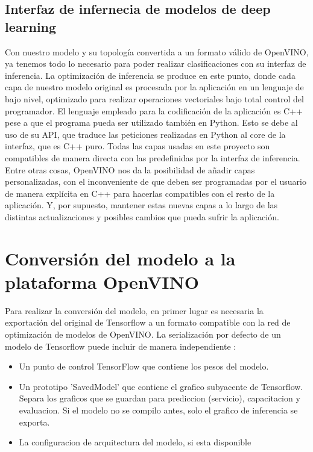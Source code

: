 \subsection{Interfaz de infernecia de modelos de deep learning}\label{subsec:interfaz-de-infernecia-de-modelos-de-deep-learning}
Con nuestro modelo y su topología convertida a un formato válido de OpenVINO, ya tenemos todo lo necesario para poder realizar clasificaciones con su interfaz de inferencia\@.
La optimización de inferencia se produce en este punto, donde cada capa de nuestro modelo original es procesada por la aplicación en un lenguaje de bajo nivel, optimizado para realizar operaciones vectoriales bajo total control del programador.
El lenguaje empleado para la codificación de la aplicación es C++ pese a que el programa pueda ser utilizado también en Python.
Esto se debe al uso de su API, que traduce las peticiones realizadas en Python al core de la interfaz, que es C++ puro.
Todas las capas usadas en este proyecto son compatibles de manera directa con las predefinidas por la interfaz de inferencia.
Entre otras cosas, OpenVINO nos da la posibilidad de añadir capas personalizadas, con el inconveniente de que deben ser programadas por el usuario de manera explícita en C++ para hacerlas compatibles con el resto de la aplicación.
Y, por supuesto, mantener estas nuevas capas a lo largo de las distintas actualizaciones y posibles cambios que pueda sufrir la aplicación.


\section{Conversión del modelo a la plataforma OpenVINO}\label{sec:conversión-del-modelo-a-la-plataforma-OpenVINO}
Para realizar la conversión del modelo, en primer lugar es necesaria la exportación del original de Tensorflow a un formato compatible con la red de optimización de modelos de OpenVINO.
La serialización por defecto de un modelo de Tensorflow puede incluir de manera independiente :

\begin{itemize}
    \item Un punto de control TensorFlow que contiene los pesos del modelo.
    \item Un prototipo 'SavedModel' que contiene el grafico subyacente de Tensorflow.
    Separa los graficos que se guardan para prediccion (servicio), capacitacion y evaluacion.
    Si el modelo no se compilo antes, solo el grafico de inferencia se exporta.
    \item La configuracion de arquitectura del modelo, si esta disponible
\end{itemize}

